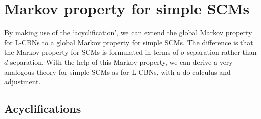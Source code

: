 \section{Markov property for simple SCMs}

By making use of the `acyclification', we can extend the global Markov property for L-CBNs to a global Markov property for simple SCMs.
The difference is that the Markov property for SCMs is formulated in terms of $\sigma$-separation rather than $d$-separation.
With the help of this Markov property, we can derive a very analogous theory for simple SCMs as for L-CBNs, with a do-calculus and adjustment.

\subsection{Acyclifications}

